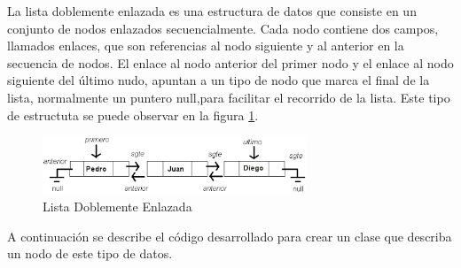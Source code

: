La lista doblemente enlazada es una estructura de datos que consiste en un conjunto de nodos enlazados secuencialmente. Cada nodo contiene dos campos, llamados enlaces, que son referencias al nodo siguiente y al anterior en la secuencia de nodos. El enlace al nodo anterior del primer nodo y el enlace al nodo siguiente del último nudo, apuntan a un tipo de nodo que marca el final de la lista, normalmente un puntero null,para facilitar el recorrido de la lista. Este tipo de estructuta se puede observar en la figura \ref{fig:LDE}.

\begin{figure}[H]
\centering
\includegraphics[width=0.7\textwidth]{imgs/Labo7/dob.png}
\caption{Lista Doblemente Enlazada}
\label{fig:LDE}
\end{figure}

A continuación se describe el código desarrollado para crear un clase que describa un nodo de este tipo de datos.

